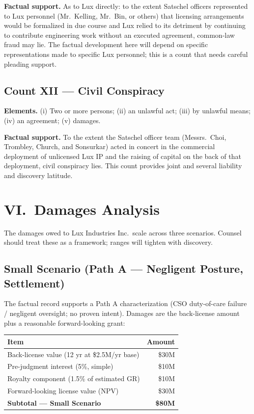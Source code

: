 \documentclass[11pt,letterpaper]{article}
\begin{document}
\textbf{Factual support.} As to Lux directly: to the extent Satschel
officers represented to Lux personnel (Mr.\ Kelling, Mr.\ Bin, or
others) that licensing arrangements would be formalized in due course
and Lux relied to its detriment by continuing to contribute engineering
work without an executed agreement, common-law fraud may lie. The
factual development here will depend on specific representations made
to specific Lux personnel; this is a count that needs careful pleading
support.

\subsection*{Count XII --- Civil Conspiracy}

\textbf{Elements.} (i) Two or more persons; (ii) an unlawful act;
(iii) by unlawful means; (iv) an agreement; (v) damages.

\textbf{Factual support.} To the extent the Satschel officer team
(Messrs.\ Choi, Trombley, Church, and Sonsurkar) acted in concert
in the commercial deployment of unlicensed Lux IP and the raising of
capital on the back of that deployment, civil conspiracy lies. This
count provides joint and several liability and discovery latitude.

\section*{VI.\ Damages Analysis}

The damages owed to Lux Industries Inc.\ scale across three scenarios.
Counsel should treat these as a framework; ranges will tighten with
discovery.

\subsection*{Small Scenario (Path A --- Negligent Posture, Settlement)}

The factual record supports a Path A characterization (CSO duty-of-care
failure / negligent oversight; no proven intent). Damages are the
back-license amount plus a reasonable forward-looking grant:

\begin{center}
\begin{tabular}{lr}
\toprule
\textbf{Item} & \textbf{Amount} \\
\midrule
Back-license value (12 yr at \$2.5M/yr base) & \$30M \\
Pre-judgment interest (5\%, simple) & \$10M \\
Royalty component (1.5\% of estimated GR) & \$10M \\
Forward-looking license value (NPV) & \$30M \\
\midrule
\textbf{Subtotal --- Small Scenario} & \textbf{\$80M} \\
\bottomrule
\end{tabular}
\end{center}
\end{document}

